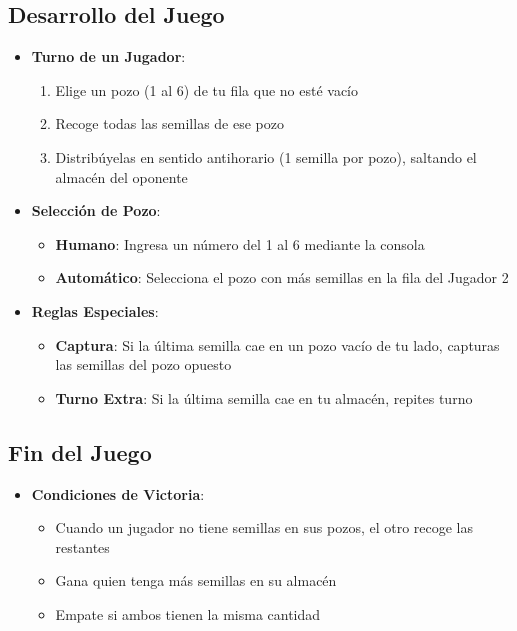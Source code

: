 \documentclass{article}
\begin{document}
\subsection{Desarrollo del Juego}
\begin{itemize}
    \item \textbf{Turno de un Jugador}:
    \begin{enumerate}
        \item Elige un pozo (1 al 6) de tu fila que no esté vacío
        \item Recoge todas las semillas de ese pozo
        \item Distribúyelas en sentido antihorario (1 semilla por pozo), saltando el almacén del oponente
    \end{enumerate}
    \item \textbf{Selección de Pozo}:
    \begin{itemize}
        \item \textbf{Humano}: Ingresa un número del 1 al 6 mediante la consola
        \item \textbf{Automático}: Selecciona el pozo con más semillas en la fila del Jugador 2
    \end{itemize}
    \item \textbf{Reglas Especiales}:
    \begin{itemize}
        \item \textbf{Captura}: Si la última semilla cae en un pozo vacío de tu lado, capturas las semillas del pozo opuesto
        \item \textbf{Turno Extra}: Si la última semilla cae en tu almacén, repites turno
    \end{itemize}
\end{itemize}

\subsection{Fin del Juego}
\begin{itemize}
    \item \textbf{Condiciones de Victoria}:
    \begin{itemize}
        \item Cuando un jugador no tiene semillas en sus pozos, el otro recoge las restantes
        \item Gana quien tenga más semillas en su almacén
        \item Empate si ambos tienen la misma cantidad
    \end{itemize}
\end{itemize}
\end{document}
